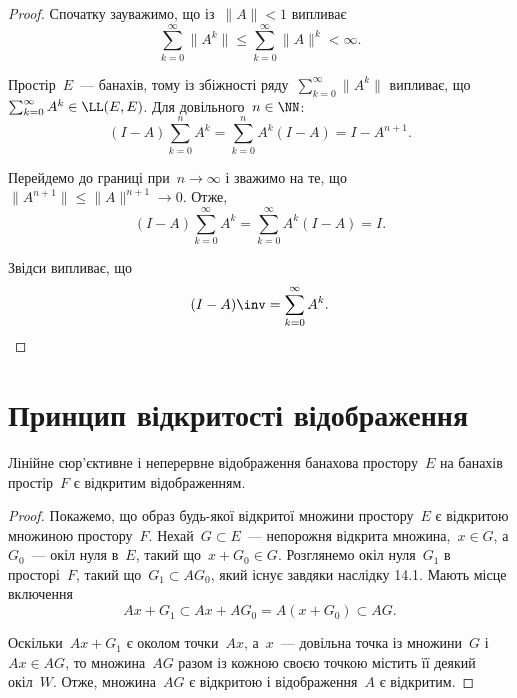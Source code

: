 \begin{proof}
Спочатку зауважимо, що із~$\|A\| < 1$ випливає
\begin{equation*}
    \sum_{k = 0}^\infty \|A^k\| \le \sum_{k = 0}^\infty \|A\|^k < \infty.
\end{equation*}

Простір~$E$~--- банахів, тому із збіжності ряду~$\sum_{k = 0}^\infty \|A^k\|$
випливає, що~$\sum_{k = 0}^\infty A^k \in \LL(E, E)$. Для довільного~$n \in \NN$:
\begin{equation*}
    (I - A) \sum_{k = 0}^n A^k = \sum_{k = 0}^n A^k (I - A) = I - A^{n + 1}.
\end{equation*}

Перейдемо до границі при~$n \to \infty$ і зважимо на те, що
$\|A^{n + 1}\| \le \|A\|^{n +1} \to 0$. Отже,
\begin{equation*}
    (I - A) \sum_{k = 0}^\infty A^k = \sum_{k = 0}^\infty A^k (I - A) = I.
\end{equation*}

Звідси випливає, що
\begin{equation*}
    (I - A)\inv = \sum_{k = 0}^\infty A^k. \qedhere
\end{equation*}
\end{proof}

\section{Принцип відкритості відображення}

\begin{theorem}
Лінійне сюр’єктивне і неперервне відображення банахова
простору~$E$ на банахів простір~$F$ є відкритим
відображенням.
\end{theorem}

\begin{proof}
Покажемо, що образ будь-якої відкритої
множини простору~$E$ є відкритою множиною простору~$F$.
Нехай~$G \subset E$~--- непорожня відкрита множина,~$x \in G$, а
$G_0$~--- окіл нуля в~$E$, такий що~$x + G_0 \in G$. Розглянемо
окіл нуля~$G_1$ в просторі~$F$, такий що~$G_1 \subset A G_0$, який існує
завдяки наслідку 14.1. Мають місце включення
\begin{equation*}
    A x + G_1 \subset A x + A G_0 = A (x + G_0) \subset A G.
\end{equation*}

Оскільки~$A x + G_1$ є околом точки~$A x$, а~$x$~--- довільна
точка із множини~$G$ і~$A x \in A G$, то множина~$A G$ разом із
кожною своєю точкою містить її деякий окіл~$W$. Отже,
множина~$A G$ є відкритою і відображення~$A$ є відкритим.
\end{proof}

